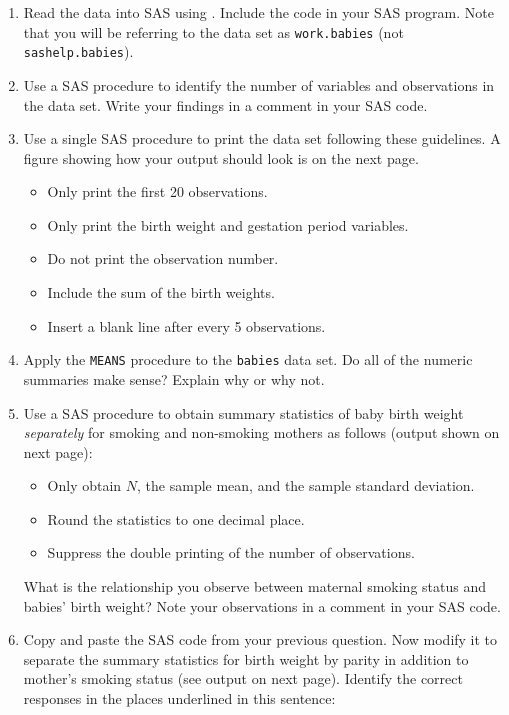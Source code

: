 \begin{enumerate}
\item Read the  data into SAS using .  Include the  code in your SAS program.  Note that you will be referring to the data set as \texttt{work.babies} (not \texttt{sashelp.babies}).
\item Use a SAS procedure to identify the number of variables and observations in the data set.  Write your findings in a comment in your SAS code.
\item Use a single SAS procedure to print the data set following these guidelines.  A figure showing how your output should look is on the next page.
\begin{itemize}
\item Only print the first 20 observations.
\item Only print the birth weight and gestation period variables.
\item Do not print the observation number.
\item Include the sum of the birth weights.
\item Insert a blank line after every 5 observations.
\end{itemize}
\item Apply the \texttt{MEANS} procedure to the \texttt{babies} data set.  Do all of the numeric summaries make sense?  Explain why or why not.
\item Use a SAS procedure to obtain summary statistics of baby birth weight \emph{separately} for smoking and non-smoking mothers as follows (output shown on next page):
\begin{itemize}
\item Only obtain $N$, the sample mean, and the sample standard deviation.
\item Round the statistics to one decimal place.
\item Suppress the double printing of the number of observations.
\end{itemize}
What is the relationship you observe between maternal smoking status and babies' birth weight? Note your observations in a comment in your SAS code.
\item  Copy and paste the SAS code from your previous question.  Now modify it to separate the summary statistics for birth weight by parity in addition to mother's smoking status (see output on next page).  Identify the correct responses in the places underlined in this sentence:

\end{enumerate}
